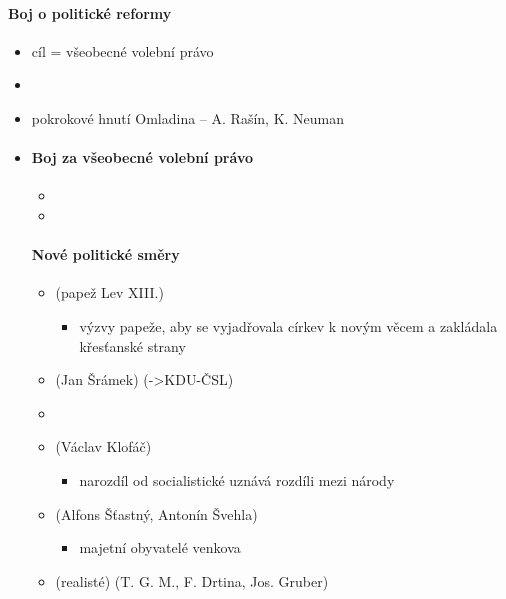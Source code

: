 \paragraph{Boj o politické reformy}
\begin{itemize}
\item cíl = všeobecné volební právo
\item {}
\item pokrokové hnutí Omladina -- A. Rašín, K. Neuman
\item {}

\paragraph{Boj za všeobecné volební právo}
\begin{itemize}
\item {}
\item {}
\end{itemize}

\paragraph{Nové politické směry}
\begin{itemize}
\item {} (papež Lev XIII.)
	\begin{itemize}
	\item výzvy papeže, aby se vyjadřovala církev k novým věcem a zakládala křesťanské strany 
	\end{itemize}
\item {} (Jan Šrámek) (->KDU-ČSL)
\item {}
\item {} (Václav Klofáč)
	\begin{itemize}
\item	narozdíl od socialistické uznává rozdíli mezi národy
	\end{itemize}
\item {} (Alfons Šťastný, Antonín Švehla)
	\begin{itemize}
	\item majetní obyvatelé venkova
	\end{itemize}
\item {} (realisté) (T. G. M., F. Drtina, Jos. Gruber)
\end{itemize}

\end{itemize}
